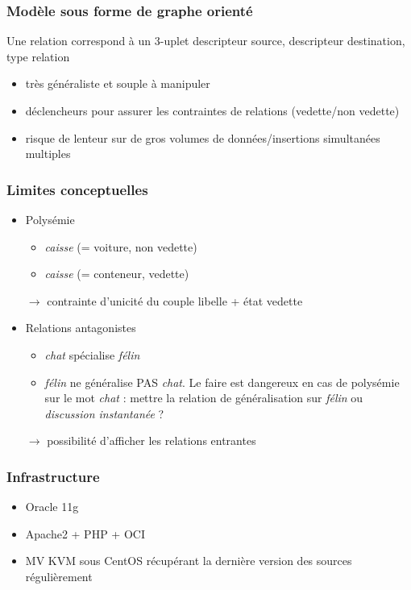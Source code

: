 \documentclass{beamer}
\begin{document}
\begin{frame}
\frametitle{Modèle sous forme de graphe orienté}
Une relation correspond à un 3-uplet descripteur source, descripteur destination, type relation
\begin{itemize}
\item très généraliste et souple à manipuler
\item déclencheurs pour assurer les contraintes de relations (vedette/non vedette)
\item risque de lenteur sur de gros volumes de données/insertions simultanées multiples
\end{itemize}
\end{frame}


\begin{frame}
\frametitle{Limites conceptuelles}
\begin{itemize}
\item Polysémie
\begin{itemize}
\item \emph{caisse} (= voiture, non vedette)
\item \emph{caisse} (= conteneur, vedette)
\end{itemize}
$\rightarrow$ contrainte d'unicité du couple libelle + état vedette

\item Relations antagonistes
\begin{itemize}
\item \emph{chat} spécialise \emph{félin}
\item \emph{félin} ne généralise PAS \emph{chat}. Le faire est dangereux en cas de polysémie sur le mot \emph{chat} : mettre la relation de généralisation sur \emph{félin} ou \emph{discussion instantanée} ?
\end{itemize}
$\rightarrow$ possibilité d'afficher les relations entrantes
\end{itemize}
\end{frame}


\begin{frame}
\frametitle{Infrastructure}
\begin{itemize}
\item Oracle 11g
\item Apache2 + PHP + OCI
\item MV KVM sous CentOS récupérant la dernière version des sources régulièrement
\end{itemize}
\end{frame}
\end{document}
